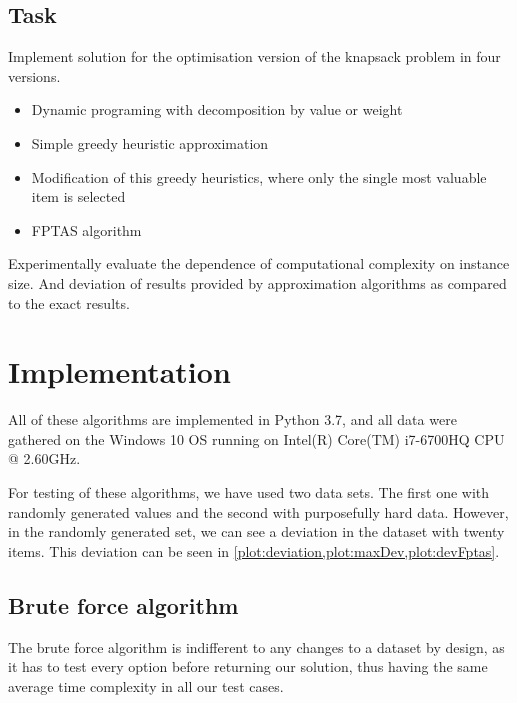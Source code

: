 \subsection{Task}
Implement solution for the optimisation version of the knapsack problem in four versions.

\begin{itemize}
    \item Dynamic programing with decomposition by value or weight
    \item Simple greedy heuristic approximation
    \item Modification of this greedy heuristics, where only the single most valuable item is selected
    \item FPTAS algorithm
\end{itemize}

Experimentally evaluate the dependence of computational complexity on instance size. And deviation of results provided by approximation algorithms as compared to the exact results. 



% 



% 

% 


\section{Implementation}
All of these algorithms are implemented in Python 3.7, and all data were gathered on the Windows 10 OS running on Intel(R) Core(TM) i7-6700HQ CPU @ 2.60GHz.

For testing of these algorithms, we have used two data sets. The first one with randomly generated values and the second with purposefully hard data. However, in the randomly generated set, we can see a deviation in the dataset with twenty items. This deviation can be seen in \cref{plot:deviation,plot:maxDev,plot:devFptas}.


\subsection{Brute force algorithm}
The brute force algorithm is indifferent to any changes to a dataset by design, as it has to test every option before returning our solution, thus having the same average time complexity in all our test cases.

